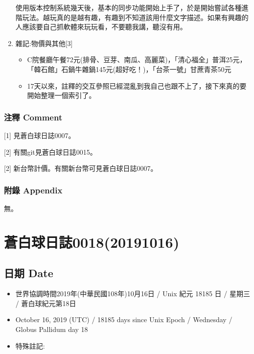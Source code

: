 \documentclass[a5paper, 12pt
]{book}
\providecommand{\tightlist}{%
  \setlength{\itemsep}{0pt}\setlength{\parskip}{0pt}}
\begin{document}
\begin{enumerate}
  使用版本控制系統幾天後，基本的同步功能開始上手了，於是開始嘗試各種進階玩法。越玩真的是越有趣，有趣到不知道該用什麼文字描述。如果有興趣的人應該要自己抓軟體來玩玩看，不要聽我講，聽沒有用。
\item
  雜記:物價與其他{[}3{]}

  \begin{itemize}
  \tightlist
  \item
    C院餐廳午餐72元(排骨、豆芽、南瓜、高麗菜)，「清心福全」普洱25元，「韓石館」石鍋牛雜鍋145元(超好吃！)，「台茶一號」甘蔗青茶50元
  \item
    17天以來，註釋的交互參照已經混亂到我自己也跟不上了，接下來真的要開始整理一個索引了。
  \end{itemize}
\end{enumerate}

\hypertarget{ux6ce8ux91cb-comment-10}{%
\subsubsection{注釋 Comment}\label{ux6ce8ux91cb-comment-10}}

{[}1{]} 見蒼白球日誌0007。

{[}2{]} 有關git見蒼白球日誌0015。

{[}2{]} 新台幣計價。有關新台幣可見蒼白球日誌0007。

\hypertarget{ux9644ux9304-appendix-9}{%
\subsubsection{附錄 Appendix}\label{ux9644ux9304-appendix-9}}

無。

\hypertarget{ux84bcux767dux7403ux65e5ux8a8c001820191016}{%
\section{蒼白球日誌0018(20191016)}\label{ux84bcux767dux7403ux65e5ux8a8c001820191016}}

\hypertarget{ux65e5ux671f-date-15}{%
\subsection{日期 Date}\label{ux65e5ux671f-date-15}}

\begin{itemize}
\tightlist
\item
  世界協調時間2019年(中華民國108年)10月16日 / Unix 紀元 18185 日 /
  星期三 / 蒼白球紀元第18日
\item
  October 16, 2019 (UTC) / 18185 days since Unix Epoch / Wednesday /
  Globus Pallidum day 18
\item
  特殊註記:
\end{itemize}
\end{document}
